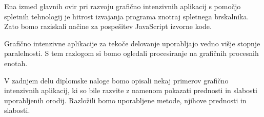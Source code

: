 Ena izmed glavnih ovir pri razvoju grafično intenzivnih aplikacij s pomočjo spletnih tehnologij je hitrost izvajanja programa znotraj spletnega brskalnika. Zato bomo raziskali načine za pospešitev JavaScript izvorne kode.

Grafično intenzivne aplikacije za tekoče delovanje uporabljajo vedno višje stopnje paralelnosti. S tem razlogom si bomo ogledali procesiranje na grafičnih procesnih enotah.

V zadnjem delu diplomske naloge bomo opisali nekaj primerov grafično intenzivnih aplikacij, ki so bile razvite z namenom pokazati prednosti in slabosti uporabljenih orodij. Razložili bomo uporabljene metode, njihove prednosti in slabosti.
